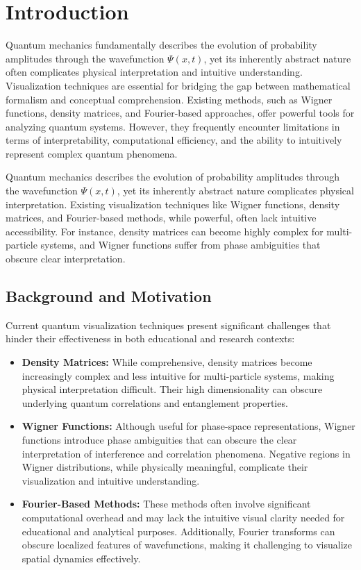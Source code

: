 \documentclass[12pt]{article}
\begin{document}
\tableofcontents

\newpage

\section{Introduction}

Quantum mechanics fundamentally describes the evolution of probability amplitudes through the wavefunction \(\Psi(x,t)\), yet its inherently abstract nature often complicates physical interpretation and intuitive understanding. Visualization techniques are essential for bridging the gap between mathematical formalism and conceptual comprehension. Existing methods, such as Wigner functions, density matrices, and Fourier-based approaches, offer powerful tools for analyzing quantum systems. However, they frequently encounter limitations in terms of interpretability, computational efficiency, and the ability to intuitively represent complex quantum phenomena.

Quantum mechanics describes the evolution of probability amplitudes through the wavefunction \(\Psi(x,t)\), yet its inherently abstract nature complicates physical interpretation. Existing visualization techniques like Wigner functions, density matrices, and Fourier-based methods, while powerful, often lack intuitive accessibility. For instance, density matrices can become highly complex for multi-particle systems, and Wigner functions suffer from phase ambiguities that obscure clear interpretation.


\subsection{Background and Motivation}

Current quantum visualization techniques present significant challenges that hinder their effectiveness in both educational and research contexts:
\begin{itemize}
    \item \textbf{Density Matrices:} While comprehensive, density matrices become increasingly complex and less intuitive for multi-particle systems, making physical interpretation difficult. Their high dimensionality can obscure underlying quantum correlations and entanglement properties.
    \item \textbf{Wigner Functions:} Although useful for phase-space representations, Wigner functions introduce phase ambiguities that can obscure the clear interpretation of interference and correlation phenomena. Negative regions in Wigner distributions, while physically meaningful, complicate their visualization and intuitive understanding.
    \item \textbf{Fourier-Based Methods:} These methods often involve significant computational overhead and may lack the intuitive visual clarity needed for educational and analytical purposes. Additionally, Fourier transforms can obscure localized features of wavefunctions, making it challenging to visualize spatial dynamics effectively.
\end{itemize}
\end{document}
